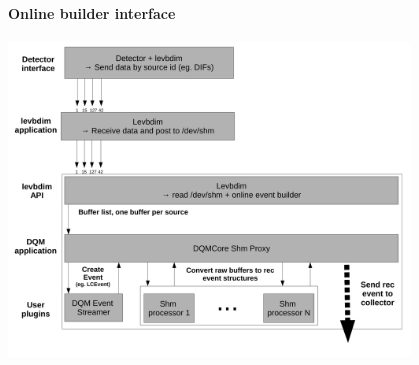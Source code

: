 \documentclass[8pt]{beamer}
\begin{document}
  
  \begin{frame}[containsverbatim]
    \frametitle{\secname}
    \framesubtitle{Online builder interface}
  
    \begin{center}
      \includegraphics[width=0.8\textwidth]{figs/DQMeventbuilder.pdf}
    \end{center}
    
  \end{frame} 
  
\end{document}

